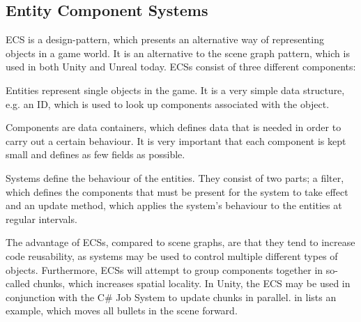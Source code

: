 \subsection{Entity Component Systems}
\gls{ECS} is a design-pattern, which presents an alternative way of representing objects in a game world. It is an alternative to the scene graph pattern\cite{scene:graph}, which is used in both Unity and Unreal today. \glspl{ECS} consist of three different components\cite{unity:ecs,ecs:general}:
\begin{labeling}{\quad\quad}
    \item[Entities] represent single objects in the game. It is a very simple data structure, e.g. an ID, which is used to look up components associated with the object.
    \item[Components] are data containers, which defines data that is needed in order to carry out a certain behaviour. It is very important that each component is kept small and defines as few fields as possible.
    \item[Systems] define the behaviour of the entities. They consist of two parts; a filter, which defines the components that must be present for the system to take effect and an update method, which applies the system's behaviour to the entities at regular intervals.
\end{labeling}

The advantage of \glspl{ECS}, compared to scene graphs, are that they tend to increase code reusability, as systems may be used to control multiple different types of objects. Furthermore, \glspl{ECS} will attempt to group components together in so-called chunks, which increases spatial locality. In Unity, the \gls{ECS} may be used in conjunction with the C\# Job System to update chunks in parallel\cite{unity:ecs}.  in  lists an example, which moves all bullets in the scene forward.
